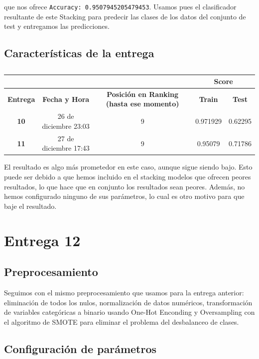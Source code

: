 \documentclass[a4paper,11pt]{article}
\begin{document}
que nos ofrece \texttt{Accuracy:  0.9507945205479453}. Usamos pues el clasificador resultante de este Stacking para predecir las clases de los datos del conjunto de test y entregamos las predicciones. 

\subsection{Características de la entrega}

\begin{table}[htbp]
	\caption{}
	\begin{tabular}{|c|c|c|c|c|}
		\hline
		\multicolumn{1}{|l|}{\textbf{}} & \textbf{} & \textbf{} & \multicolumn{ 2}{c|}{\textbf{Score}} \\ \hline
		\textbf{Entrega} & \textbf{Fecha y Hora} & \textbf{Posición en Ranking (hasta ese momento)} & \textbf{Train} & \textbf{Test} \\ \hline
		\textbf{10} & 26 de diciembre 23:03 & 9 & 0.971929 & 0.62295 \\ \hline
		\textbf{11} & 27 de diciembre  17:43 & 9 & 0.95079 & 0.71786 \\ \hline
	\end{tabular}
	\label{}
\end{table}

El resultado es algo más prometedor en este caso, aunque sigue siendo bajo. Esto puede ser debido a que hemos incluido en el stacking modelos que ofrecen peores resultados, lo que hace que en conjunto los resultados sean peores. Además, no hemos configurado ninguno de sus parámetros, lo cual es otro motivo para que baje el resultado. 

\section{Entrega 12}
\subsection{Preprocesamiento}

Seguimos con el mismo preprocesamiento que usamos para la entrega anterior: eliminación de todos los nulos, normalización de datos numéricos, transformación de variables categóricas a binario usando One-Hot Enconding y Oversampling con el algoritmo de SMOTE para eliminar el problema del desbalanceo de clases.

\subsection{Configuración de parámetros}
\end{document}
